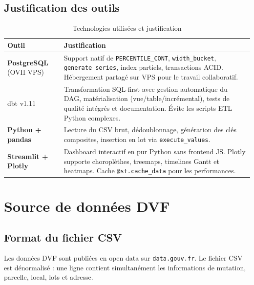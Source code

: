 \documentclass[12pt,a4paper]{article}
\let\oldsection\section
\renewcommand{\section}{\clearpage\oldsection}
\newcommand{\dbt}{dbt}
\newcommand{\sql}[1]{\texttt{\small #1}}
\begin{document}
\subsection{Justification des outils}

\begin{table}[H]
  \centering
  \begin{tabularx}{\linewidth}{lX}
    \toprule
    \textbf{Outil} & \textbf{Justification} \\
    \midrule
    \textbf{PostgreSQL} (OVH VPS)
      & Support natif de \sql{PERCENTILE\_CONT}, \sql{width\_bucket},
        \sql{generate\_series}, index partiels, transactions ACID.
        Hébergement partagé sur VPS pour le travail collaboratif. \\
    \dbt{} v1.11
      & Transformation SQL-first avec gestion automatique du DAG,
        matérialisation (vue/table/incrémental), tests de qualité
        intégrés et documentation. Évite les scripts ETL Python complexes. \\
    \textbf{Python + pandas}
      & Lecture du CSV brut, dédoublonnage, génération des clés
        composites, insertion en lot via \sql{execute\_values}. \\
    \textbf{Streamlit + Plotly}
      & Dashboard interactif en pur Python sans frontend JS.
        Plotly supporte choroplèthes, treemaps, timelines Gantt
        et heatmaps. Cache \sql{@st.cache\_data} pour les performances. \\
    \bottomrule
  \end{tabularx}
  \caption{Technologies utilisées et justification}
\end{table}

\section{Source de données DVF}

\subsection{Format du fichier CSV}

Les données DVF sont publiées en open data sur \texttt{data.gouv.fr}.
Le fichier CSV est dénormalisé : une ligne contient simultanément
les informations de mutation, parcelle, local, lots et adresse.
\end{document}
